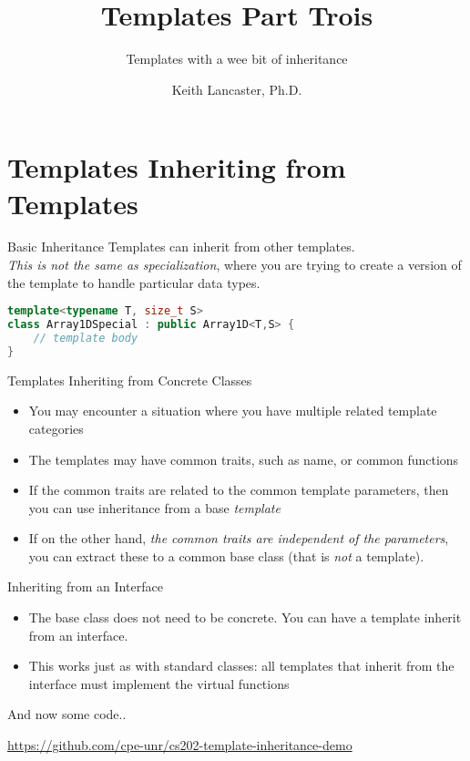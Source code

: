 \documentclass[10pt,xcolor={table,dvipsnames},t]{beamer}
\title[Your Short Title]{Templates Part Trois}
\subtitle{Templates with a wee bit of inheritance}
\author{Keith Lancaster, Ph.D.}
\institute{Department of Computer Science and Engineering}
\date{}
\begin{document}
\begin{frame}
  \titlepage
\end{frame}


\section{Templates Inheriting from Templates}
\begin{frame}[fragile]{Basic Inheritance}
\large
Templates can inherit from other templates. \\  \textit{This is not the same as specialization}, where you 
are trying to create a version of the template to handle particular data types.
\vspace{1cm}
\lstset{
  xleftmargin=.2\textwidth, xrightmargin=.2\textwidth
}
\begin{lstlisting}[language=C++]
template<typename T, size_t S>
class Array1DSpecial : public Array1D<T,S> {
    // template body
}
\end{lstlisting}

\end{frame}
\begin{frame}[c]{Templates Inheriting from Concrete Classes}
\begin{itemize}
	\item You may encounter a situation where you have multiple related template categories
    \item The templates may have common traits, such as name, or common functions
    \item If the common traits are related to the common template parameters, then
    you can use inheritance from a base \textit{template}
    \item If on the other hand, \textit{the common traits are independent of the parameters},
    you can extract these to a common base class (that is \textit{not} a template).
\end{itemize}

\end{frame}

\begin{frame}[c]{Inheriting from an Interface}
\begin{itemize}
	\item The base class does not need to be concrete. You can have a template
	inherit from an interface.
	\item This works just as with standard classes: all templates that inherit from the
	interface must implement the virtual functions
\end{itemize}


\end{frame}
\begin{frame}[c]{And now some code..}

\normalsize 
\url{https://github.com/cpe-unr/cs202-template-inheritance-demo}
\end{frame}
\end{document}
